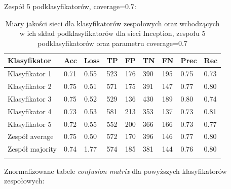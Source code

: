 \documentclass[polish,12pt]{aghthesis}
\begin{document}
\vspace{3mm}
\noindent Zespół 5 podklasyfikatorów, coverage=0.7:
\renewcommand{\arraystretch}{1.75}
 \begin{longtable}[h!]{|m{2.6cm}|m{1.2cm}|m{1.2cm}|m{1.2cm}|m{1.2cm}|m{1.2cm}|m{1.2cm}|m{1.2cm}|m{1.2cm}|}
 \hline
 Klasyfikator & Acc & Loss & TP & FP & TN & FN & Prec & Rec\\
 \hline
 Klasyfikator 1 & 0.71 & 0.55 & 523 & 176 & 390 & 195 & 0.75 & 0.73\\
 \hline
 Klasyfikator 2 & 0.75 & 0.51 & 571 & 175 & 391 & 147 & 0.77 & 0.80\\
 \hline
 Klasyfikator 3 & 0.75 & 0.52 & 529 & 136 & 430 & 189 & 0.80 & 0.74\\
 \hline
 Klasyfikator 4 & 0.73 & 0.53 & 581 & 213 & 353 & 137 & 0.73 & 0.81\\
 \hline
 Klasyfikator 5 & 0.72 & 0.55 & 552 & 200 & 366 & 166 & 0.73 & 0.77\\
 \hline
 Zespół average & 0.75 & 0.50 & 572 & 170 & 396 & 146 & 0.77 & 0.80\\ 
 \hline
 Zespół \newline majority & 0.74 & 1.77 & 574 & 185 & 381 & 144 & 0.76 & 0.80\\
 \hline
\caption{Miary jakości sieci dla klasyfikatorów zespołowych oraz wchodzących w ich skład podklasyfikatorów dla sieci Inception, zespołu 5 podklasyfikatorów oraz parametru coverage=0.7}
\label{table:28}
\end{longtable}
\newpage
\noindent Znormalizowane tabele \textit{confusion matrix} dla powyższych klasyfikatorów zespołowych:
\end{document}
